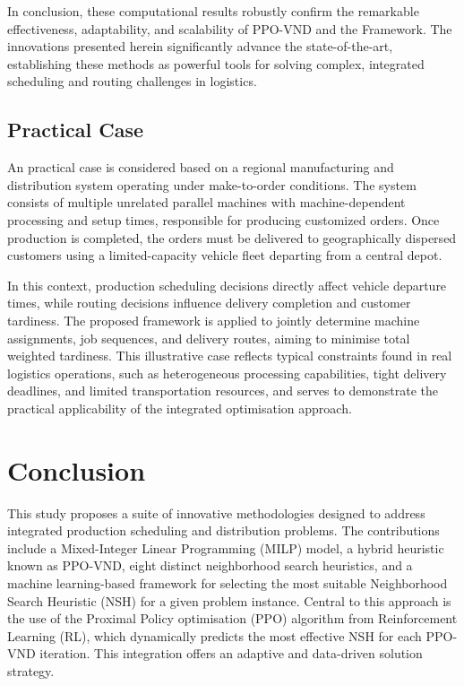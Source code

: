 \documentclass{article}
\begin{document}
In conclusion, these computational results robustly confirm the remarkable effectiveness, adaptability, and scalability of PPO-VND and the Framework. The innovations presented herein significantly advance the state-of-the-art, establishing these methods as powerful tools for solving complex, integrated scheduling and routing challenges in logistics.

\subsection{Practical Case}
An practical case is considered based on a regional manufacturing and distribution system operating under make-to-order conditions. The system consists of multiple unrelated parallel machines with machine-dependent processing and setup times, responsible for producing customized orders. Once production is completed, the orders must be delivered to geographically dispersed customers using a limited-capacity vehicle fleet departing from a central depot.

In this context, production scheduling decisions directly affect vehicle departure times, while routing decisions influence delivery completion and customer tardiness. The proposed framework is applied to jointly determine machine assignments, job sequences, and delivery routes, aiming to minimise total weighted tardiness. This illustrative case reflects typical constraints found in real logistics operations, such as heterogeneous processing capabilities, tight delivery deadlines, and limited transportation resources, and serves to demonstrate the practical applicability of the integrated optimisation approach.

\section{Conclusion}
\label{sec:Conclusions}

This study proposes a suite of innovative methodologies designed to address integrated production scheduling and distribution problems. The contributions include a Mixed-Integer Linear Programming (MILP) model, a hybrid heuristic known as PPO-VND, eight distinct neighborhood search heuristics, and a machine learning-based framework for selecting the most suitable Neighborhood Search Heuristic (NSH) for a given problem instance. Central to this approach is the use of the Proximal Policy optimisation (PPO) algorithm from Reinforcement Learning (RL), which dynamically predicts the most effective NSH for each PPO-VND iteration. This integration offers an adaptive and data-driven solution strategy.
\end{document}
